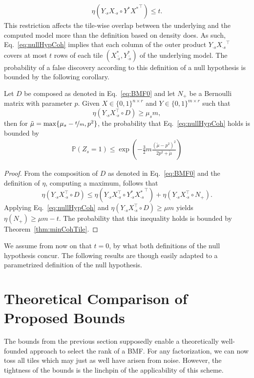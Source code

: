 \begin{align}\label{eq:nullHypCoh}
\eta(Y_{\cdot s}X_{\cdot s}\circ Y^*{X^*}^\top)\leq t.
\end{align}
This restriction affects the tile-wise overlap between the underlying and the computed model more than the definition based on density does. As such, Eq.~\eqref{eq:nullHypCoh} implies that each column of the outer product $Y_{\cdot s}{X_{\cdot s}}^\top$ covers at most $t$ rows of each tile $(X^*_{\cdot \tilde{s}},Y^*_{\cdot \tilde{s}})$ of the underlying model. The probability of a false discovery according to this definition of a null hypothesis is bounded by the following corollary. 
\begin{corollary}\label{thm:cohZ}
Let $D$ be composed as denoted in Eq.~\eqref{eq:BMF0} and let $N_+$ be a Bernoulli matrix with parameter $p$. Given $X\in\{0,1\}^{n\times r}$ and $Y\in\{0,1\}^{m\times r}$ such that 
\[\eta(Y_{\cdot s}X_{\cdot s}^\top \circ D)\geq \mu_s m,\] 
then for $\tilde{\mu} = \max\{\mu_s-\nicefrac{t}{m},p^2\}$, the probability that Eq.~\eqref{eq:nullHypCoh} holds is bounded by
\begin{align*}
\mathbb{P}(Z_s=1)\leq \exp\left(-\frac{3}{2}m\frac{(\tilde{\mu}-p^2)^2}{2p^2+\tilde{\mu}}\right)
\end{align*}
\end{corollary}
\begin{proof} 
From the composition of $D$ as denoted in Eq.~\eqref{eq:BMF0} and the definition of $\eta$, computing a maximum, follows that 
\[\eta(Y_{\cdot s}X_{\cdot s}^\top \circ D)\leq \eta(Y_{\cdot s}X_{\cdot s}^\top \circ Y^*_{\cdot s}{X^*_{\cdot s}}^\top)+\eta(Y_{\cdot s}X_{\cdot s}^\top \circ N_+).\]
Applying Eq.~\eqref{eq:nullHypCoh} and $\eta(Y_{\cdot s}X_{\cdot s}^\top \circ D)\geq \mu m$ yields
$\eta(N_+)\geq \mu m-t$.
The probability that this inequality holds is bounded by Theorem~\ref{thm:minCohTile}.
\end{proof}
We assume from now on that $t=0$, by what both definitions of the null hypothesis concur. The following results are though easily adapted to a parametrized definition of the null hypothesis.  
\section{Theoretical Comparison of Proposed Bounds}\label{sec:theoryCompare}
The bounds from the previous section supposedly enable a theoretically well-founded approach to select the rank of a BMF. For any factorization, we can now toss all tiles which may just as well have arisen from noise.
However, the tightness of the bounds is the linchpin of the applicability of this scheme. 

